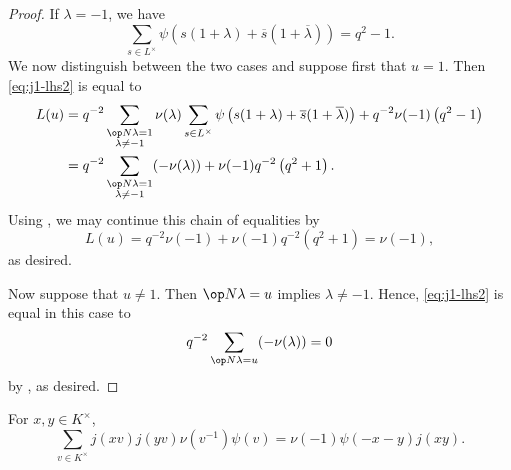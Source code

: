 \documentclass[../main.tex]{subfiles}
\begin{document}
\begin{proof}
	If $\lambda=-1$, we have
	\[\sum_{s\in L^\times}\psi\left(s(1+\lambda)+\overline s(1+\overline\lambda)\right)=q^2-1.\]
	We now distinguish between the two cases and suppose first that $u=1$. Then \eqref{eq:j1-lhs2} is equal to
	\begin{align}
		L(u) &= q^{-2}\sum_{\substack{\op N\lambda=1\\\lambda\ne-1}}\nu(\lambda)\sum_{s\in L^\times}\psi\left(s(1+\lambda)+\overline s(1+\overline\lambda)\right)+q^{-2}\nu(-1)\left(q^2-1\right) \\
		&= q^{-2}\sum_{\substack{\op N\lambda=1\\\lambda\ne-1}}(-\nu(\lambda))+\nu(-1)q^{-2}\left(q^2+1\right).
	\end{align}
	Using , we may continue this chain of equalities by
	\[L(u)=q^{-2}\nu(-1)+\nu(-1)q^{-2}\left(q^2+1\right)=\nu(-1),\]
	as desired.

	Now suppose that $u\ne1$. Then $\op N\lambda=u$ implies $\lambda\ne-1$. Hence, \eqref{eq:j1-lhs2} is equal in this case to
	\[q^{-2}\sum_{\op N\lambda=u}(-\nu(\lambda))=0\]
	by , as desired.
\end{proof}
\begin{lemma} \label{lem:j2}
	For $x,y\in K^\times$,
	\[\sum_{v\in K^\times}j(xv)j(yv)\nu\left(v^{-1}\right)\psi(v)=\nu(-1)\psi(-x-y)j(xy).\]
\end{lemma}
\end{document}
